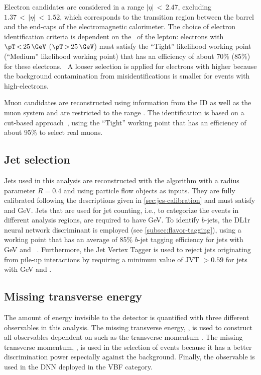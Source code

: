 Electron candidates are considered in a range $|\eta| \,{<}\, 2.47$, excluding $1.37\,{<}\,|\eta|\,{<}\,1.52$, which corresponds to the transition region between the barrel and the end-caps of the electromagnetic calorimeter.
The choice of electron identification criteria is dependent on the \pT\ of the lepton: electrons with $\pT \,{<}\,25\,\GeV$ ($\pT\,{>}\,25\,\GeV$) must satisfy the ``Tight'' likelihood working point (``Medium'' likelihood working point) that has an efficiency of about 70\% (85\%) for these electrons.~\cite{EGAM-2018-01}
A looser selection is applied for electrons with higher \pT because the background contamination from misidentifications is smaller for events with high-\pT electrons.

Muon candidates are reconstructed using information from the ID as well as the muon system and are restricted to the range .
The identification is based on a cut-based approach~\cite{MUON-2018-03}, using the ``Tight'' working point that has an efficiency of about 95\% to select real muons.

\subsection{Jet selection}
Jets used in this analysis are reconstructed with the \antikt algorithm with a radius parameter $R = 0.4$ and using particle flow objects as inputs.
They are fully calibrated following the descriptions given in \cref{sec:jes-calibration} and must satisfy  and GeV.
Jets that are used for jet counting, i.e., to categorize the events in different analysis regions, are required to have GeV.
To identify $b$-jets, the DL1r neural network discriminant is employed (see \cref{subsec:flavor-tagging}), using a working point that has an average of 85\% $b$-jet tagging efficiency for jets with GeV and ~\cite{FTAG-2018-01}.
Furthermore, the Jet Vertex Tagger is used to reject jets originating from pile-up interactions by requiring a minimum value of JVT $> 0.59$ for jets with GeV and .

\subsection{Missing transverse energy}
The amount of energy invisible to the detector is quantified with three different observables in this analysis.
The missing transverse energy, \ETmiss, is used to construct all observables dependent on \ETmiss such as the transverse momentum \mT.
The missing transverse momentum, \pTmiss, is used in the selection of events because it has a better discrimination power especially against the \Zgamma background.
Finally, the \METSig observable is used in the DNN deployed in the VBF category.

